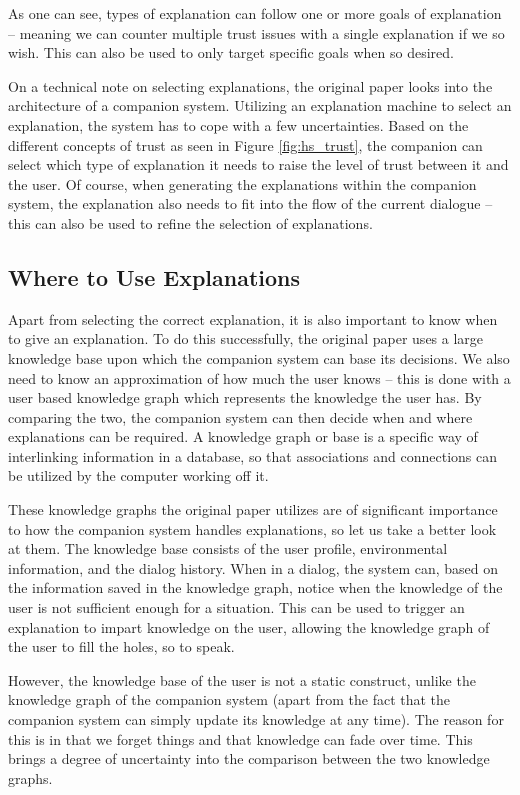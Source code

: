 \documentclass[a4paper]{article}
\begin{document}
As one can see, types of explanation can follow one or more goals of explanation – meaning we can counter multiple trust issues with a single explanation if we so wish. This can also be used to only target specific goals when so desired.

On a technical note on selecting explanations, the original paper looks into the architecture of a companion system. Utilizing an explanation machine to select an explanation, the system has to cope with a few uncertainties. Based on the different concepts of trust as seen in Figure \ref{fig:hs_trust}, the companion can select which type of explanation it needs to raise the level of trust between it and the user. Of course, when generating the explanations within the companion system, the explanation also needs to fit into the flow of the current dialogue – this can also be used to refine the selection of explanations.

\subsection{Where to Use Explanations}
\label{know_graph}

Apart from selecting the correct explanation, it is also important to know when to give an explanation. To do this successfully, the original paper uses a large knowledge base upon which the companion system can base its decisions. We also need to know an approximation of how much the user knows – this is done with a user based knowledge graph which represents the knowledge the user has. By comparing the two, the companion system can then decide when and where explanations can be required. A knowledge graph or base is a specific way of interlinking information in a database, so that associations and connections can be utilized by the computer working off it.

These knowledge graphs the original paper utilizes are of significant importance to how the companion system handles explanations, so let us take a better look at them. The knowledge base consists of the user profile, environmental information, and the dialog history. When in a dialog, the system can, based on the information saved in the knowledge graph, notice when the knowledge of the user is not sufficient enough for a situation. This can be used to trigger an explanation to impart knowledge on the user, allowing the knowledge graph of the user to fill the holes, so to speak.

However, the knowledge base of the user is not a static construct, unlike the knowledge graph of the companion system (apart from the fact that the companion system can simply update its knowledge at any time). The reason for this is in that we forget things and that knowledge can fade over time. This brings a degree of uncertainty into the comparison between the two knowledge graphs.
\end{document}
